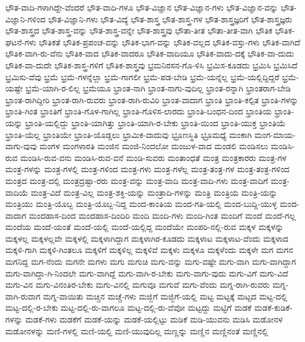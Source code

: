 {ಭೌತ-ವಾದಿ-ಗಳಾಗಿದ್ದೇ-ವೆಂದರೆ
ಭೌತ-ವಾದಿ-ಗಳೂ
ಭೌತ-ವಿಜ್ಞಾನ
ಭೌತ-ವಿಜ್ಞಾನ-ಗಳು
ಭೌತ-ವಿಜ್ಞಾನ-ವನ್ನು
ಭೌತ-ವಿಜ್ಞಾನಿ-ಗಳಿಂದ
ಭೌತ-ವಿಜ್ಞಾನಿ-ಗಳು
ಭೌತ-ವಿದ್ಯೆ
ಭೌತ-ಶಾಸ್ತ್ರ
ಭೌತ-ಶಾಸ್ತ್ರ-ಗಳ
ಭೌತ-ಶಾಸ್ತ್ರಜ್ಞರಿಗೆ
ಭೌತ-ಶಾಸ್ತ್ರಜ್ಞರು
ಭೌತ-ಶಾಸ್ತ್ರದ
ಭೌತ-ಶಾಸ್ತ್ರ-ವನ್ನು
ಭೌತ-ಶಾಸ್ತ್ರ-ವನ್ನೇ
ಭೌತ-ಶಾಸ್ತ್ರವು
ಭೌತಾ-ತೀತ
ಭೌತಾ-ತೀತ-ವಾಗಿ
ಭೌತಿಕ
ಭೌತಿಕ-ಘಟನೆ-ಗಳು
ಭೌತಿಕತೆ
ಭೌತಿಕ-ಪ್ರಪಂಚ-ವನ್ನು
ಭೌತಿಕ-ಭಾಗ-ವನ್ನು
ಭೌತಿಕ-ವಲ್ಲದ
ಭೌತಿಕ-ವಸ್ತು-ಗಳು
ಭೌತಿಕ-ವಾಗಿದೆ
ಭೌತಿಕ-ವಾಗಿ-ರು-ವೆನು
ಭೌತಿಕ-ವಾದ
ಭೌತಿಕ-ವಾದರೂ
ಭೌತಿಕ-ವಾದಿಯೂ
ಭೌತಿಕ-ವಾದು-ದಕ್ಕೆ
ಭೌತಿಕ-ವಾ-ದುದು
ಭೌತಿಕ-ವಾ-ದುದೇ
ಭೌತಿಕ-ಶಾಸ್ತ್ರ-ಗಳಿಗೆ
ಭೌತಿಕ-ಶಾಸ್ತ್ರವು
ಭ್ರಮನಿರಸನ-ಗೊ-ಳಿಸಿ
ಭ್ರಮಿಸ-ಕೂಡದು
ಭ್ರಮಿಸಿ
ಭ್ರಮಿಸಿದೆ
ಭ್ರಮಿಸು-ವೆವು
ಭ್ರಮೆ
ಭ್ರಮೆ-ಗಳನ್ನೆಲ್ಲಾ
ಭ್ರಮೆ-ಗಾಗಲೀ
ಭ್ರಮೆ-ಪಡ-ಬೇಡಿ
ಭ್ರಮೆ-ಯನ್ನೆಲ್ಲ
ಭ್ರಮೆ-ಯಲ್ಲಿದ್ದಿದ್ದರೆ
ಭ್ರಮೆ-ಯಷ್ಟೇ
ಭ್ರಮೆ-ಯಾಗಿ-ರ-ಲಿಲ್ಲ
ಭ್ರಮೆಯೂ
ಭ್ರಾಂತ-ನಾಗಿ
ಭ್ರಾಂತ-ನಾಗು-ವುದಿಲ್ಲ
ಭ್ರಾಂತ-ರನ್ನಾಗಿ
ಭ್ರಾಂತರಾಗ-ಬೇಡಿ
ಭ್ರಾಂತ-ರಾಗಿದ್ದೀರಿ
ಭ್ರಾಂತ-ರಾಗಿ-ರುವರು
ಭ್ರಾಂತ-ರಾಗಿ-ರುವಿರಿ
ಭ್ರಾಂತ-ವಾದಾಗ
ಭ್ರಾಂತಿ
ಭ್ರಾಂತಿ-ಕಲ್ಪಿತ
ಭ್ರಾಂತಿ-ಗಳನ್ನು
ಭ್ರಾಂತಿ-ಗಿಂತ
ಭ್ರಾಂತಿಗೆ
ಭ್ರಾಂತಿ-ಗೊಳ-ಗಾಗಿಲ್ಲ
ಭ್ರಾಂತಿ-ಗೊಳಿಸ-ಲಾರದು
ಭ್ರಾಂತಿ-ಬಂಧನ-ದಿಂದ
ಭ್ರಾಂತಿಯ
ಭ್ರಾಂತಿ-ಯನ್ನು
ಭ್ರಾಂತಿ-ಯಲ್ಲಿದ್ದು
ಭ್ರಾಂತಿ-ಯಾಗಿತ್ತು
ಭ್ರಾಂತಿ-ಯಾಗಿ-ರ-ಬೇಕು
ಭ್ರಾಂತಿ-ಯಿಂದ
ಭ್ರಾಂತಿ-ಯುಕ್ತ
ಭ್ರಾಂತಿಯೆ
ಭ್ರಾಂತಿ-ಯೆಲ್ಲ
ಭ್ರಾಂತಿಯೇ
ಭ್ರಾಂತಿ-ಯೊಡ್ಡಲು
ಭ್ರಾಮಿಕ-ವಾದುವು
ಭ್ರೂಣಸ್ಥಿತಿ
ಭ್ರೂಮಧ್ಯೆ
ಮಂಕಾಗಿ
ಮಂಗ-ಮಾಯ-ವಾಗು-ವುವು
ಮಂಗಳ
ಮಂಗಳಾರತಿ
ಮಂಜಿನ
ಮಂಜಿ-ನಿಂದಲೋ
ಮಂಜುಳ-ವಾದ
ಮಂಡಲಿ
ಮಂಡಿಸಲು
ಮಂಡಿಸಿ-ರುವ
ಮಂಡಿಸಿ-ರುವ-ವನು
ಮಂಡಿಸಿ-ರುವ-ವನೆ
ಮಂಡಿ-ಸುವರು
ಮಂತಾಂಧತೆ
ಮಂತ್ರ
ಮಂತ್ರಕಾರರು
ಮಂತ್ರ-ಗಳ
ಮಂತ್ರ-ಗಳನ್ನು
ಮಂತ್ರ-ಗಳಲ್ಲಿ
ಮಂತ್ರ-ಗಳಿಂದ
ಮಂತ್ರ-ಗಳು
ಮಂತ್ರ-ಗಳೆಲ್ಲ
ಮಂತ್ರ-ತಂತ್ರ-ಗಳ
ಮಂತ್ರ-ತಂತ್ರ-ಗಳಿಂದ
ಮಂತ್ರದ
ಮಂತ್ರ-ದಲ್ಲಿ
ಮಂತ್ರದ್ರಷ್ಟಾ-ರರು
ಮಂತ್ರ-ವನ್ನು
ಮಂತ್ರ-ವಾದಿ
ಮಂತ್ರ-ವಾದಿ-ಗಳು
ಮಂತ್ರ-ವಾದಿಗೆ
ಮಂತ್ರ-ವಾದಿಯೆ
ಮಂತ್ರ-ವಿದೆ
ಮಂತ್ರ-ವಿಲ್ಲ
ಮಂತ್ರ-ಶಕ್ತಿ-ಯನ್ನು
ಮಂತ್ರಾದಿ-ಗಳನ್ನು
ಮಂತ್ರಿ
ಮಂತ್ರಿಯ
ಮಂತ್ರಿ-ಯನ್ನು
ಮಂತ್ರಿಯು
ಮಂತ್ರಿ-ಯೊಬ್ಬ
ಮಂತ್ರಿ-ಯೊಬ್ಬ-ನಿದ್ದ
ಮಂದ-ಕಾಂತಿಯ
ಮಂದ-ಗತಿ-ಯಲ್ಲಿ
ಮಂದ-ಬುದ್ದಿ-ಯುಳ್ಳ
ಮಂದ-ವಾದಾಗ
ಮಂದಹಾಸ-ದಿಂದ
ಮಂದಹಾಸ-ದಿಂದಿರಿ
ಮಂದಿ
ಮಂದಿ-ಗಳು
ಮಂದಿ-ಗಿಂತ
ಮಂದಿಗೆ
ಮಂದೆ
ಮಂದೆ-ಗಲ್ಲ
ಮಂದೆಯ
ಮಂದೆ-ಯಂತೆ
ಮಂದೆ-ಯಲ್ಲಿ
ಮಂದೆ-ಯಲ್ಲಿದ್ದ
ಮಂದೆಯೇ
ಮಂಪರಿ-ನಲ್ಲಿ-ರುವ
ಮಕ್ಕಳ
ಮಕ್ಕಳನ್ನು
ಮಕ್ಕಳಲ್ಲ
ಮಕ್ಕಳಲ್ಲವೇ
ಮಕ್ಕಳಲ್ಲಿ
ಮಕ್ಕಳಾಗಿದ್ದಾಗ
ಮಕ್ಕಳಾಗಿರ-ಕೂಡದು
ಮಕ್ಕಳಾಟ
ಮಕ್ಕಳಾಟ-ವೆಂದು
ಮಕ್ಕಳಾದ
ಮಕ್ಕಳಿ-ಗಾಗಿ
ಮಕ್ಕಳಿ-ಗಿಂತಲೂ
ಮಕ್ಕಳಿಗೆ
ಮಕ್ಕಳಿಲ್ಲ
ಮಕ್ಕಳಿವೆ
ಮಕ್ಕಳು
ಮಕ್ಕಳೂ
ಮಕ್ಕಳೆಂದು
ಮಕ್ಕಳೇ
ಮಗ
ಮಗನ
ಮಗನಿದ್ದ
ಮಗ-ನೆಂದು
ಮಗನೇ
ಮಗಳು
ಮಗು
ಮಗುಚಿ
ಮಗು-ವನ್ನು
ಮಗು-ವಷ್ಟೇ
ಮಗು-ವಾಗಿ
ಮಗು-ವಾಗಿದ್ದಾಗ
ಮಗು-ವಾಗಿದ್ದಾ-ಗಿ-ನಿಂದಲೇ
ಮಗು-ವಾಗಿದ್ದೆ
ಮಗು-ವಾಗಿ-ರ-ಬೇಕು
ಮಗು-ವಾಗು-ವುದು
ಮಗು-ವಿಗೆ
ಮಗು-ವಿದೆ
ಮಗು-ವಿನ
ಮಗು-ವಿನಂತಿರ-ಬೇಕು
ಮಗು-ವಿನಲ್ಲಿ
ಮಗುವೂ
ಮಗುವೆ
ಮಗು-ವೆಂದು
ಮಗ್ನ-ರಾಗಿ-ರುವರು
ಮಗ್ನ-ವಾಗಿ-ರುವಾಗ
ಮಗ್ನ-ವಾಯಿತು
ಮಚ್ಚಿನ
ಮಚ್ಚೆ-ಗಳು
ಮಜ್ಜಿಗೆ
ಮಜ್ಜಿಗೆ-ಯಲ್ಲಿ
ಮಟ್ಟ
ಮಟ್ಟಕ್ಕೆ
ಮಟ್ಟದ
ಮಟ್ಟ-ದಲ್ಲಿ
ಮಟ್ಟ-ದಲ್ಲಿ-ರ-ಬೇಕು
ಮಟ್ಟ-ದಲ್ಲಿ-ರು-ವಾಗಲೂ
ಮಟ್ಟ-ದಲ್ಲಿ-ರು-ವೆವೋ
ಮಟ್ಟದ್ದು
ಮಟ್ಟಿಗೆ
ಮಡಕೆ
ಮಡಕೆ-ಕುಡಿಕೆ-ಗಳನ್ನು
ಮಡಕೆ-ಗಳು
ಮಡಕೆಗೆ
ಮಡಕೆ-ಯನ್ನು
ಮಡಕೆ-ಯಲ್ಲಿಟ್ಟು
ಮಡಿಕೆ
ಮಡಿ-ಯುವನು
ಮಡಿಸಿ
ಮಡೋನಳ
ಮಡೋನಳನ್ನು
ಮಣಿ-ಗಳಲ್ಲಿ
ಮಣಿ-ಯಲ್ಲಿ
ಮಣಿ-ಯುವುದಿಲ್ಲ
ಮಣ್ಣನ್ನು
ಮಣ್ಣಿನ
ಮಣ್ಣಿನಂತೆ
ಮಣ್ಣಿನಲ್ಲಿ
}
